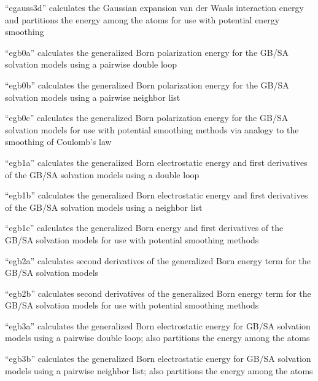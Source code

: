 \documentclass[letterpaper,11pt,english]{sphinxmanual}
\begin{document}
“egauss3d” calculates the Gaussian expansion van der Waals
interaction energy and partitions the energy among the atoms
for use with potential energy smoothing


“egb0a” calculates the generalized Born polarization energy
for the GB/SA solvation models using a pairwise double loop


“egb0b” calculates the generalized Born polarization energy
for the GB/SA solvation models using a pairwise neighbor list


“egb0c” calculates the generalized Born polarization energy
for the GB/SA solvation models for use with potential smoothing
methods via analogy to the smoothing of Coulomb’s law


“egb1a” calculates the generalized Born electrostatic energy
and first derivatives of the GB/SA solvation models using a
double loop


“egb1b” calculates the generalized Born electrostatic energy
and first derivatives of the GB/SA solvation models using a
neighbor list


“egb1c” calculates the generalized Born energy and first
derivatives of the GB/SA solvation models for use with
potential smoothing methods


“egb2a” calculates second derivatives of the generalized
Born energy term for the GB/SA solvation models


“egb2b” calculates second derivatives of the generalized
Born energy term for the GB/SA solvation models for use with
potential smoothing methods


“egb3a” calculates the generalized Born electrostatic energy
for GB/SA solvation models using a pairwise double loop; also
partitions the energy among the atoms


“egb3b” calculates the generalized Born electrostatic energy
for GB/SA solvation models using a pairwise neighbor list; also
partitions the energy among the atoms
\end{document}
